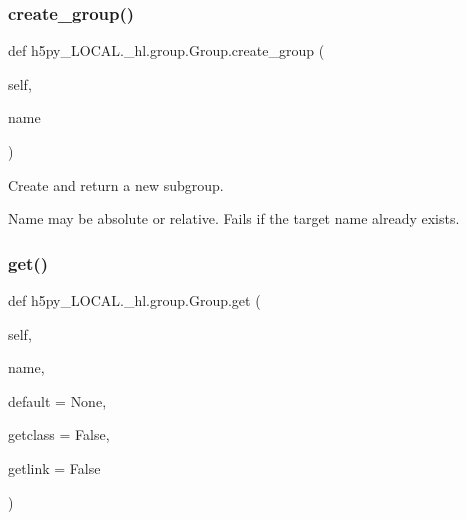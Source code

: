 \subsubsection{\texorpdfstring{create\+\_\+group()}{create\_group()}}
{\footnotesize\ttfamily def h5py\+\_\+\+L\+O\+C\+A\+L.\+\_\+hl.\+group.\+Group.\+create\+\_\+group (\begin{DoxyParamCaption}\item[{}]{self,  }\item[{}]{name }\end{DoxyParamCaption})}

\begin{DoxyVerb}Create and return a new subgroup.

Name may be absolute or relative.  Fails if the target name already
exists.
\end{DoxyVerb}
 \mbox{\label{classh5py__LOCAL_1_1__hl_1_1group_1_1Group_ab6d62403f8b24ea32e8f6c511d768f03}} 
\subsubsection{\texorpdfstring{get()}{get()}}
{\footnotesize\ttfamily def h5py\+\_\+\+L\+O\+C\+A\+L.\+\_\+hl.\+group.\+Group.\+get (\begin{DoxyParamCaption}\item[{}]{self,  }\item[{}]{name,  }\item[{}]{default = {\ttfamily None},  }\item[{}]{getclass = {\ttfamily False},  }\item[{}]{getlink = {\ttfamily False} }\end{DoxyParamCaption})}

